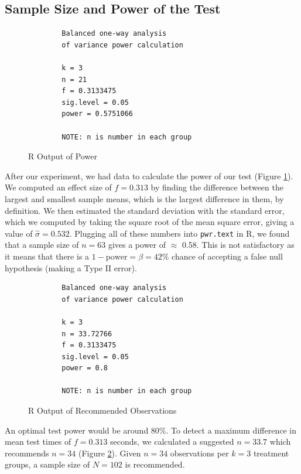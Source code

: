 \documentclass[11pt,a4paper,twoside]{tau-book}
\begin{document}
\subsection{Sample Size and Power of the Test}

\begin{figure}[H]
        \raggedleft
        \begin{verbatim}
        Balanced one-way analysis
        of variance power calculation
        
        k = 3
        n = 21
        f = 0.3133475
        sig.level = 0.05
        power = 0.5751066
        
        NOTE: n is number in each group    
        \end{verbatim}
        \caption{R Output of Power}
        \label{fig:power_cognitive}
\end{figure}

After our experiment, we had data to calculate the power of our test (Figure \ref{fig:power_cognitive}). We computed an effect size of $f=0.313$ by finding the difference between the largest and smallest sample means, which is the largest difference in them, by definition. We then estimated the standard deviation with the standard error, which we computed by taking the square root of the mean square error, giving a value of $\widehat{\sigma} = 0.532$. Plugging all of these numbers into \texttt{pwr.text} in R, we found that a sample size of $n=63$ gives a power of $\approx$ 0.58. This is not satisfactory as it means that there is a $1-\text{power} = \beta = 42\%$ chance of accepting a false null hypothesis (making a Type II error).


\begin{figure}[H]
        \raggedleft
        \begin{verbatim}
        Balanced one-way analysis
        of variance power calculation
        
        k = 3
        n = 33.72766
        f = 0.3133475
        sig.level = 0.05
        power = 0.8
        
        NOTE: n is number in each group    
        \end{verbatim}
        \caption{R Output of Recommended Observations}
        \label{fig:power_cognitive_2}
\end{figure}

An optimal test power would be around 80\%. To detect a maximum difference in mean test times of $f=0.313$ seconds, we calculated a suggested $n=33.7$ which recommends $n=34$ (Figure \ref{fig:power_cognitive_2}). Given $n=34$ observations per $k=3$ treatment groups, a sample size of $N=102$ is recommended.
\end{document}
